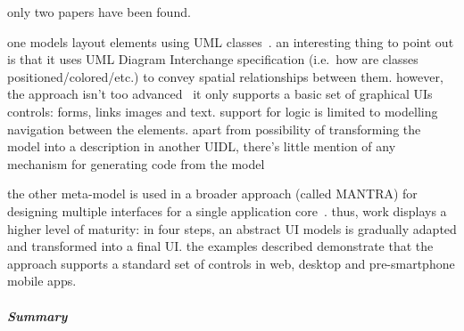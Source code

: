 only two papers have been found.

one models layout elements using UML classes~\cite{Blankenhorn2004-og}.
an interesting thing to point out is that it uses UML Diagram Interchange specification (i.e.~how are classes positioned/colored/etc.) to convey spatial relationships between them.
however, the approach isn't too advanced \textemdash\ it only supports a basic set of graphical UIs controls: forms, links images and text.
support for logic is limited to modelling navigation between the elements.
apart from possibility of transforming the model into a description in another UIDL, there's little mention of any mechanism for generating code from the model

the other meta-model is used in a broader approach (called MANTRA) for designing multiple interfaces for a single application core~\cite{Botterweck2011-ra}.
thus, work displays a higher level of maturity: in four steps, an abstract UI models is gradually adapted and transformed into a final UI\@.
the examples described demonstrate that the approach supports a standard set of controls in web, desktop and pre-smartphone mobile apps.

\subparagraph{Summary}

